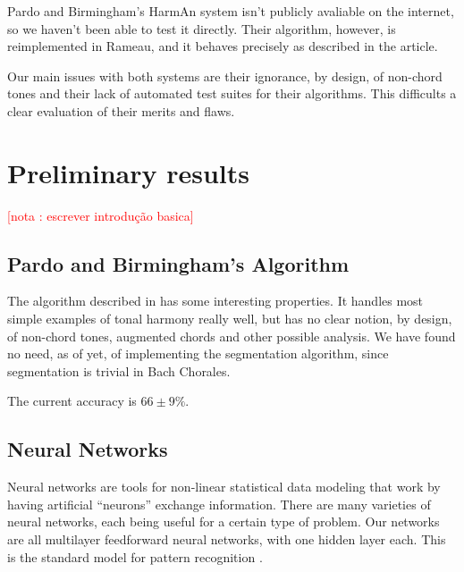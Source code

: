 \documentclass{article}
\newcounter{notacounter}
\newcommand{\nota}[1]{
  \addtocounter{notacounter}{1}
  \textcolor{red}{[nota \arabic{notacounter}: #1]}
}
\begin{document}
Pardo and Birmingham's HarmAn \cite{pardo.ea:automated} system isn't
publicly avaliable on the internet, so we haven't been able to test it
directly. Their algorithm, however, is reimplemented in Rameau, and it
behaves precisely as described in the article.

Our main issues with both systems are their ignorance, by design, of
non-chord tones and their lack of automated test suites for their
algorithms. This difficults a clear evaluation of their merits and
flaws.

\section{Preliminary results}
\label{sec:analysis-results}

\nota{escrever introdução basica}

\subsection{Pardo and Birmingham's Algorithm}
\label{sec:pardo-birmingham}

The algorithm described in \cite{pardo.ea:automated} has some
interesting properties. It handles most simple examples of tonal
harmony really well, but has no clear notion, by design, of non-chord
tones, augmented chords and other possible analysis. We
have found no need, as of yet, of implementing the segmentation
algorithm, since segmentation is trivial in Bach Chorales.

The current accuracy is $66 \pm 9\%$.


\subsection{Neural Networks}
\label{sec:neural-nets}

Neural networks are tools for non-linear statistical data
modeling that work by having artificial ``neurons'' exchange
information. There are many varieties of neural networks, each being
useful for a certain type of problem. Our networks are all multilayer
feedforward neural networks, with one hidden layer each. This is the
standard model for pattern recognition \cite{russell.ea:artificial}.
\end{document}
